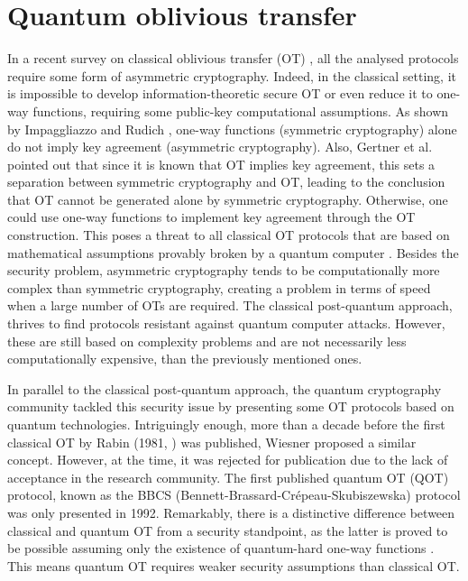 


%

\chapter{Quantum oblivious transfer}
\label{chapter_QOT}


In a recent survey on classical oblivious transfer (OT) \cite{YAVV22}, all the analysed protocols require some form of asymmetric cryptography. Indeed, in the classical setting, it is impossible to develop information-theoretic secure OT or even reduce it to one-way functions, requiring some public-key computational assumptions. As shown by Impaggliazzo and Rudich \cite{IR89}, one-way functions (symmetric cryptography) alone do not imply key agreement (asymmetric cryptography). Also, Gertner et al. \cite{GKMRV00} pointed out that since it is known that OT implies key agreement, this sets a separation between symmetric cryptography and OT, leading to the conclusion that OT cannot be generated alone by symmetric cryptography. Otherwise, one could use one-way functions to implement key agreement through the OT construction. This poses a threat to all classical OT protocols \cite{EGL85, NP01, CO15} that are based on mathematical assumptions provably broken by a quantum computer \cite{Sho95}. Besides the security problem, asymmetric cryptography tends to be computationally more complex than symmetric cryptography, creating a problem in terms of speed when a large number of OTs are required. The classical post-quantum approach, thrives to find protocols resistant against quantum computer attacks. However, these are still based on complexity problems and are not necessarily less computationally expensive, than the previously mentioned ones. 

In parallel to the classical post-quantum approach, the quantum cryptography community tackled this security issue by presenting some OT protocols based on quantum technologies. Intriguingly enough, more than a decade before the first classical OT by Rabin (1981, \cite{Rabin81}) was published, Wiesner proposed a similar concept. However, at the time, it was rejected for publication due to the lack of acceptance in the research community. The first published quantum OT (QOT) protocol, known as the BBCS (Bennett-Brassard-Cr{\'e}peau-Skubiszewska) protocol \cite{BBCS92} was only presented in 1992. Remarkably, there is a distinctive difference between classical and quantum OT from a security standpoint, as the latter is proved to be possible assuming only the existence of quantum-hard one-way functions \cite{GLSV21, BCKM21}. This means quantum OT requires weaker security assumptions than classical OT.

